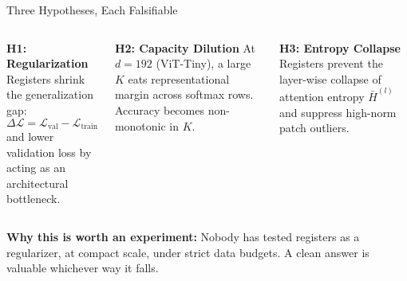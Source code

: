 \documentclass[aspectratio=169]{beamer}
\begin{document}
\begin{frame}{Three Hypotheses, Each Falsifiable}
\small
\begin{columns}[T]
\begin{block}{\textbf{H1: Regularization}}
Registers shrink the generalization gap:
$$\Delta\mathcal{L} = \mathcal{L}_{\text{val}} - \mathcal{L}_{\text{train}}$$
and lower validation loss by acting as an architectural bottleneck.
\end{block}

\begin{block}{\textbf{H2: Capacity Dilution}}
At $d = 192$ (ViT-Tiny), a large $K$ eats representational margin across softmax rows. Accuracy becomes non-monotonic in $K$.
\end{block}

\begin{block}{\textbf{H3: Entropy Collapse}}
Registers prevent the layer-wise collapse of attention entropy $\bar{H}^{(l)}$ and suppress high-norm patch outliers.
\end{block}
\end{columns}

\medskip
\begin{center}
\footnotesize
\textbf{Why this is worth an experiment:} Nobody has tested registers as a regularizer, at compact scale, under strict data budgets. A clean answer is valuable whichever way it falls.
\end{center}
\end{frame}
\end{document}
